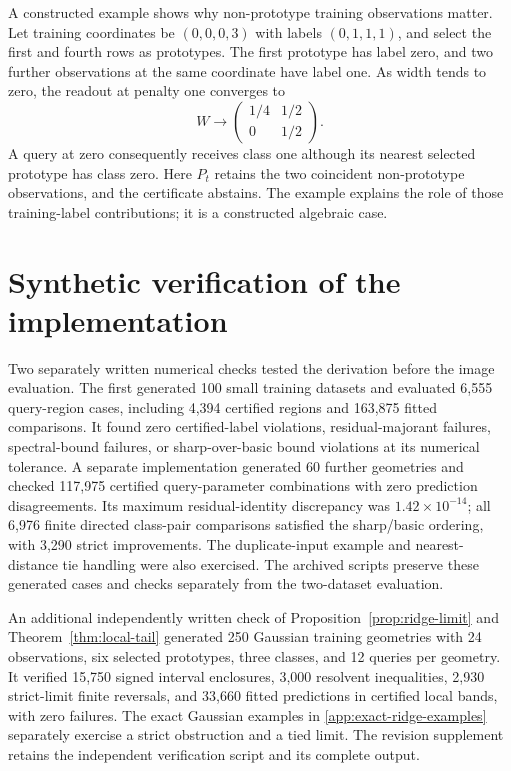 \documentclass[preprint,12pt,authoryear]{elsarticle}
\begin{document}
A constructed example shows why non-prototype training observations matter. Let training coordinates be $(0,0,0,3)$ with labels $(0,1,1,1)$, and select the first and fourth rows as prototypes. The first prototype has label zero, and two further observations at the same coordinate have label one. As width tends to zero, the readout at penalty one converges to
\[
 W\longrightarrow
 \begin{pmatrix}1/4&1/2\\0&1/2\end{pmatrix}.
\]
A query at zero consequently receives class one although its nearest selected prototype has class zero. Here $P_t$ retains the two coincident non-prototype observations, and the certificate abstains. The example explains the role of those training-label contributions; it is a constructed algebraic case.

\section{Synthetic verification of the implementation}
Two separately written numerical checks tested the derivation before the image evaluation. The first generated 100 small training datasets and evaluated 6,555 query-region cases, including 4,394 certified regions and 163,875 fitted comparisons. It found zero certified-label violations, residual-majorant failures, spectral-bound failures, or sharp-over-basic bound violations at its numerical tolerance. A separate implementation generated 60 further geometries and checked 117,975 certified query-parameter combinations with zero prediction disagreements. Its maximum residual-identity discrepancy was $1.42\times10^{-14}$; all 6,976 finite directed class-pair comparisons satisfied the sharp/basic ordering, with 3,290 strict improvements. The duplicate-input example and nearest-distance tie handling were also exercised. The archived scripts preserve these generated cases and checks separately from the two-dataset evaluation.

An additional independently written check of Proposition~\ref{prop:ridge-limit} and Theorem~\ref{thm:local-tail} generated 250 Gaussian training geometries with 24 observations, six selected prototypes, three classes, and 12 queries per geometry. It verified 15,750 signed interval enclosures, 3,000 resolvent inequalities, 2,930 strict-limit finite reversals, and 33,660 fitted predictions in certified local bands, with zero failures. The exact Gaussian examples in \ref{app:exact-ridge-examples} separately exercise a strict obstruction and a tied limit. The revision supplement retains the independent verification script and its complete output.
\end{document}
